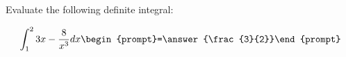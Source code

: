 \documentclass{ximera}
\author{Jim Talamo}
\begin{document}
\begin{exercise}
Evaluate the following definite integral:

\[
\int_1^2 3x-\frac{8}{x^3} dx 
\begin{prompt}=\answer{\frac{3}{2}}\end{prompt}
\]
\end{exercise}
\end{document}
